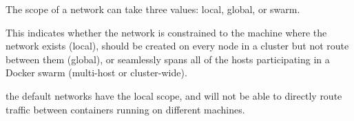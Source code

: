 The scope of a network can take three values: local, global, or swarm.

This indicates whether the network is constrained to the machine where the network exists (local), should be created on every node in a cluster but not route between them (global), or seamlessly spans all of the hosts participating in a Docker swarm (multi-host or cluster-wide).

the default networks have the local scope, and will not be able to directly route traffic between containers running on different machines.

